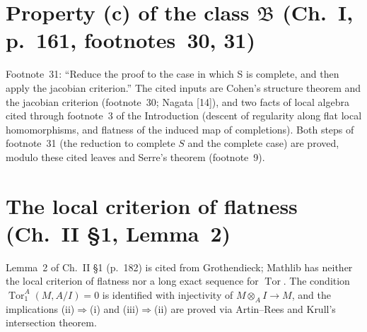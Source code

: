 
\section{Property (c) of the class $\mathfrak B$ (Ch.~I, p.~161, footnotes~30, 31)}
Footnote~31: ``Reduce the proof to the case in which S is complete, and then apply the jacobian
criterion.'' The cited inputs are Cohen's structure theorem and the jacobian criterion (footnote~30;
Nagata [14]), and two facts of local algebra cited
through footnote~3 of the Introduction (descent of regularity along flat local homomorphisms, and
flatness of the induced map of completions). Both steps of footnote~31 (the reduction to complete $S$ and the complete case) are proved, modulo these cited leaves and Serre's theorem (footnote~9).


\section{The local criterion of flatness (Ch.~II \S1, Lemma~2)}

Lemma~2 of Ch.~II \S1 (p.~182) is cited from Grothendieck; Mathlib has neither the local
criterion of flatness nor a long exact sequence for $\operatorname{Tor}$.  The condition
$\operatorname{Tor}_1^A(M,A/I)=0$ is identified with injectivity of $M\otimes_AI\to M$, and the
implications (ii)$\Rightarrow$(i) and (iii)$\Rightarrow$(ii) are proved via Artin--Rees and
Krull's intersection theorem.

